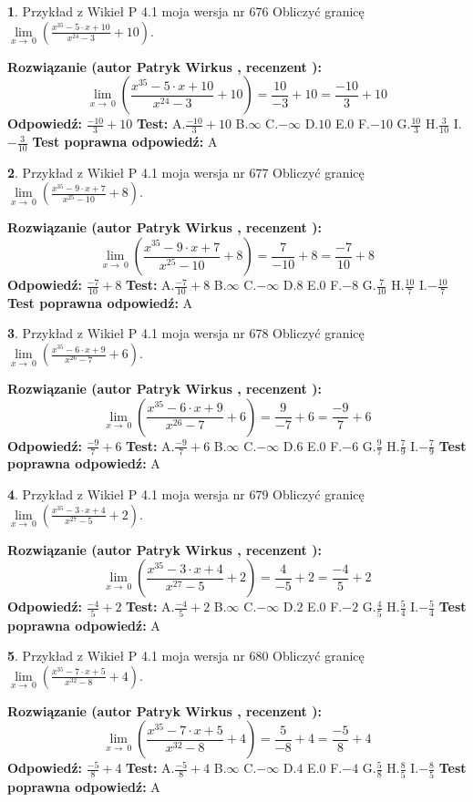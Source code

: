 \documentclass[12pt, a4paper]{article}
\theoremstyle{definition} %
\newtheorem{zad}{}
\newcommand{\zadStart}[1]{\begin{zad}#1\newline}
\newcommand{\zadStop}{\end{zad}}
\newcommand{\rozwStart}[2]{\noindent \textbf{Rozwiązanie (autor #1 , recenzent #2): }\newline}
\newcommand{\rozwStop}{\newline}
\newcommand{\odpStart}{\noindent \textbf{Odpowiedź:}\newline}
\newcommand{\odpStop}{\newline}
\newcommand{\testStart}{\noindent \textbf{Test:}\newline}
\newcommand{\testStop}{\newline}
\newcommand{\kluczStart}{\noindent \textbf{Test poprawna odpowiedź:}\newline}
\newcommand{\kluczStop}{\newline}
\begin{document}
\zadStart{Przykład z Wikieł P 4.1 moja wersja nr 676}
Obliczyć granicę $\lim\limits_{x\to\ 0}(\frac{x^{35}-5 \cdot x +10}{x^{24}-3}+10)$.
\zadStop
\rozwStart{Patryk Wirkus}{}
$$\lim\limits_{x\to\ 0}(\frac{x^{35}-5 \cdot x +10}{x^{24}-3}+10)=\frac{10}{-3}+10=\frac{-10}{3}+10$$
\rozwStop
\odpStart
$\frac{-10}{3}+10$
\odpStop
\testStart
A.$\frac{-10}{3}+10$
B.$\infty$
C.$-\infty$
D.$10$
E.$0$
F.$-10$
G.$\frac{10}{3}$
H.$\frac{3}{10}$
I.$-\frac{3}{10}$
\testStop
\kluczStart
A
\kluczStop



\zadStart{Przykład z Wikieł P 4.1 moja wersja nr 677}
Obliczyć granicę $\lim\limits_{x\to\ 0}(\frac{x^{35}-9 \cdot x +7}{x^{25}-10}+8)$.
\zadStop
\rozwStart{Patryk Wirkus}{}
$$\lim\limits_{x\to\ 0}(\frac{x^{35}-9 \cdot x +7}{x^{25}-10}+8)=\frac{7}{-10}+8=\frac{-7}{10}+8$$
\rozwStop
\odpStart
$\frac{-7}{10}+8$
\odpStop
\testStart
A.$\frac{-7}{10}+8$
B.$\infty$
C.$-\infty$
D.$8$
E.$0$
F.$-8$
G.$\frac{7}{10}$
H.$\frac{10}{7}$
I.$-\frac{10}{7}$
\testStop
\kluczStart
A
\kluczStop



\zadStart{Przykład z Wikieł P 4.1 moja wersja nr 678}
Obliczyć granicę $\lim\limits_{x\to\ 0}(\frac{x^{35}-6 \cdot x +9}{x^{26}-7}+6)$.
\zadStop
\rozwStart{Patryk Wirkus}{}
$$\lim\limits_{x\to\ 0}(\frac{x^{35}-6 \cdot x +9}{x^{26}-7}+6)=\frac{9}{-7}+6=\frac{-9}{7}+6$$
\rozwStop
\odpStart
$\frac{-9}{7}+6$
\odpStop
\testStart
A.$\frac{-9}{7}+6$
B.$\infty$
C.$-\infty$
D.$6$
E.$0$
F.$-6$
G.$\frac{9}{7}$
H.$\frac{7}{9}$
I.$-\frac{7}{9}$
\testStop
\kluczStart
A
\kluczStop



\zadStart{Przykład z Wikieł P 4.1 moja wersja nr 679}
Obliczyć granicę $\lim\limits_{x\to\ 0}(\frac{x^{35}-3 \cdot x +4}{x^{27}-5}+2)$.
\zadStop
\rozwStart{Patryk Wirkus}{}
$$\lim\limits_{x\to\ 0}(\frac{x^{35}-3 \cdot x +4}{x^{27}-5}+2)=\frac{4}{-5}+2=\frac{-4}{5}+2$$
\rozwStop
\odpStart
$\frac{-4}{5}+2$
\odpStop
\testStart
A.$\frac{-4}{5}+2$
B.$\infty$
C.$-\infty$
D.$2$
E.$0$
F.$-2$
G.$\frac{4}{5}$
H.$\frac{5}{4}$
I.$-\frac{5}{4}$
\testStop
\kluczStart
A
\kluczStop



\zadStart{Przykład z Wikieł P 4.1 moja wersja nr 680}
Obliczyć granicę $\lim\limits_{x\to\ 0}(\frac{x^{35}-7 \cdot x +5}{x^{32}-8}+4)$.
\zadStop
\rozwStart{Patryk Wirkus}{}
$$\lim\limits_{x\to\ 0}(\frac{x^{35}-7 \cdot x +5}{x^{32}-8}+4)=\frac{5}{-8}+4=\frac{-5}{8}+4$$
\rozwStop
\odpStart
$\frac{-5}{8}+4$
\odpStop
\testStart
A.$\frac{-5}{8}+4$
B.$\infty$
C.$-\infty$
D.$4$
E.$0$
F.$-4$
G.$\frac{5}{8}$
H.$\frac{8}{5}$
I.$-\frac{8}{5}$
\testStop
\kluczStart
A
\kluczStop
\end{document}

